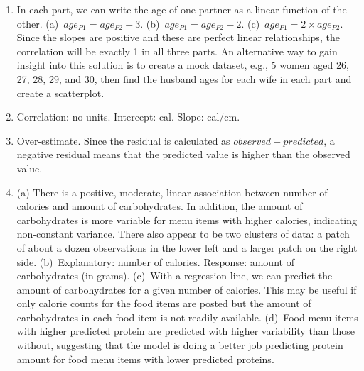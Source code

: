 \documentclass[
  10pt,
  openany]{book}
\begin{document}
\begin{enumerate}
  \addtocounter{enumi}{1}
\item
  In each part, we can write the age of one partner as a linear function of the other. (a)~\(age_{P1} = age_{P2} + 3\). (b)~\(age_{P1} = age_{P2} - 2\). (c)~\(age_{P1} = 2 \times age_{P2}\). Since the slopes are positive and these are perfect linear relationships, the correlation will be exactly 1 in all three parts. An alternative way to gain insight into this solution is to create a mock dataset, e.g., 5 women aged 26, 27, 28, 29, and 30, then find the husband ages for each wife in each part and create a scatterplot.

  \addtocounter{enumi}{1}
\item
  Correlation: no units. Intercept: cal. Slope: cal/cm.

  \addtocounter{enumi}{1}
\item
  Over-estimate. Since the residual is calculated as \(observed - predicted\), a negative residual means that the predicted value is higher than the observed value.

  \addtocounter{enumi}{1}
\item
  (a) There is a positive, moderate, linear association between number of calories and amount of carbohydrates. In addition, the amount of carbohydrates is more variable for menu items with higher calories, indicating non-constant variance. There also appear to be two clusters of data: a patch of about a dozen observations in the lower left and a larger patch on the right side. (b)~Explanatory: number of calories. Response: amount of carbohydrates (in grams). (c)~With a regression line, we can predict the amount of carbohydrates for a given number of calories. This may be useful if only calorie counts for the food items are posted but the amount of carbohydrates in each food item is not readily available. (d)~Food menu items with higher predicted protein are predicted with higher variability than those without, suggesting that the model is doing a better job predicting protein amount for food menu items with lower predicted proteins.


\end{enumerate}
\end{document}
